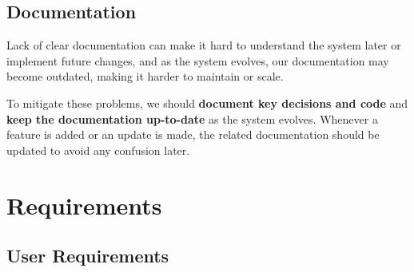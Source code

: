 \documentclass[a4paper,journal]{IEEEtran}
\begin{document}
\subsection{Documentation}
Lack of clear documentation can make it hard to understand the system later or
implement future changes, and as the system evolves, our documentation may
become outdated, making it harder to maintain or scale.

To mitigate these problems, we should
\textbf{document key decisions and code} and
\textbf{keep the documentation up-to-date} as the system evolves.
Whenever a feature is added or an update is made, the related documentation
should be updated to avoid any confusion later.

\section{Requirements}
\subsection{User Requirements}
\end{document}
